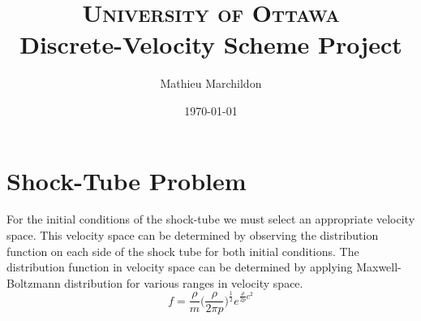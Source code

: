 \documentclass[paper=a4, fontsize=12pt]{scrartcl}
\title{
	\normalfont \normalsize
	\textsc{University of Ottawa} \\ [5pt]
	\huge Discrete-Velocity Scheme Project
}
\author{Mathieu Marchildon} %
\date{\normalsize \today} %
\begin{document}
\maketitle


\section*{Shock-Tube Problem}
For the initial conditions of the shock-tube we must select an appropriate velocity space.
This velocity space can be determined by observing the distribution function on each side of
the shock tube for both initial conditions.
The distribution function in velocity space can be determined by applying Maxwell-Boltzmann distribution
for various ranges in velocity space.
\[
        f = \frac{\rho}{m} \Big( \frac{\rho}{2 \pi p}\Big)^{\frac{1}{2}}e^{\frac{\rho}{2 p}c^2}
\]
\end{document}
